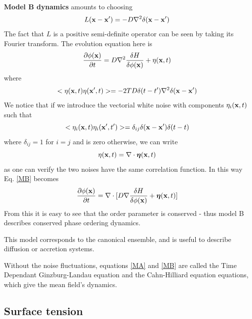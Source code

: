 \textbf{Model B dynamics} amounts to choosing
\begin{equation}
    L({\bf x}-{\bf x}')= -D\nabla^2 \delta({\bf x}-{\bf x'})
\end{equation}
The fact that $L$ is a positive semi-definite operator can be seen by taking its Fourier transform. The evolution equation here is
\begin{equation}
    \frac{\partial \phi({\bf x})}{\partial t}= D\nabla^2 \frac{\delta H}{\delta \phi({\bf x})} + \eta({\bf x},t)
    \label{MB}
\end{equation}
where
\begin{equation}
    < \eta({\bf x},t)\eta({\bf x}',t)> =-2TD   \delta(t-t')\nabla^2\delta({\bf x}-{\bf x'})
\end{equation}
We notice that if we introduce the vectorial white noise with components $\eta_i({\bf x},t)$ such that
\begin{equation}
    < \eta_i({\bf x},t) \eta_i({\bf x}',t')> =\delta_{ij} \delta({\bf x}-{\bf x'})\delta(t-t)
\end{equation}
where $\delta_{ij}=1$ for $i=j$ and is zero otherwise,  we can write
\begin{equation}
    \eta({\bf x},t)= \nabla\cdot {\boldsymbol \eta}({\bf x},t)
\end{equation}
as one can verify the two noises have the same correlation function. In this way Eq. \eqref{MB} becomes 
\begin{equation}
    \frac{\partial \phi({\bf x})}{\partial t}= \nabla\cdot[ D\nabla \frac{\delta H}{\delta \phi({\bf x})} +         {\boldsymbol\eta}({\bf x},t)]
\end{equation}
From this it is easy to see that the order parameter is conserved - thus model  B describes conserved phase ordering dynamics. {\color{purple}This model corresponds to the canonical ensemble, and is useful to describe diffusion or accretion systems.

Without the noise fluctuations, equations \eqref{MA} and \eqref{MB} are called the Time Dependant Ginzburg-Landau equation \cite{tuszynski_exact_1984} and the Cahn-Hilliard equation\cite{cahn_free_1958} equations, which give the mean field's dynamics.}


    \subsection{Surface tension}

